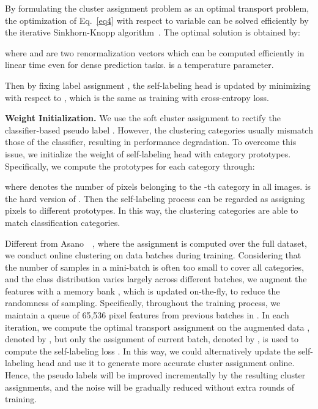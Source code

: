 \documentclass[10pt,twocolumn,letterpaper]{article}
\begin{document}
	By formulating the cluster assignment problem as an optimal transport problem, the optimization of Eq.~\ref{eq4} with respect to variable  can be solved efficiently by the iterative Sinkhorn-Knopp algorithm~\cite{cuturi2013sinkhorn}. The optimal solution is obtained by:
	
	where  and  are two renormalization vectors which can be computed efficiently in linear time even for dense prediction tasks.  is a temperature parameter. 
	
	Then by fixing label assignment , the self-labeling head  is updated by minimizing  with respect to , which is the same as training with cross-entropy loss.
	
	\vspace{0.5em}\noindent\textbf{Weight Initialization.} We use the soft cluster assignment  to rectify the classifier-based pseudo label . However, the clustering categories usually mismatch those of the classifier, resulting in performance degradation. To overcome this issue, we initialize the weight of self-labeling head  with category prototypes. Specifically, we compute the prototypes  for each category through:
	
	where  denotes the number of pixels belonging to the -th category in all images.  is the hard version of . Then the self-labeling process can be regarded as assigning pixels to different prototypes. In this way, the clustering categories are able to match classification categories.
	
	\vspace{0.5em} Different from Asano~\etal~\cite{asano2020self}, where the assignment  is computed over the full dataset, we conduct online clustering on data batches during training. Considering that the number of samples in a mini-batch is often too small to cover all categories, and the class distribution varies largely across different batches, we augment the features  with a memory bank , which is updated on-the-fly, to reduce the randomness of sampling. Specifically, throughout the training process, we maintain a queue of 65,536 pixel features from previous batches in . In each iteration, we compute the optimal transport assignment on the augmented data , denoted by , but only the assignment of current batch, denoted by , is used to compute the self-labeling loss . In this way, we could alternatively update the self-labeling head  and use it to generate more accurate cluster assignment  online. Hence, the pseudo labels will be improved incrementally by the resulting cluster assignments, and the noise will be gradually reduced without extra rounds of training. 
	
\end{document}

